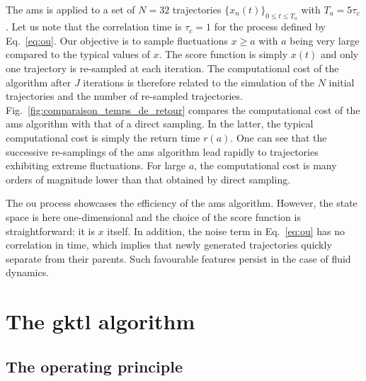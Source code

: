 \documentclass{jfm}
\newcommand{\EL}[1]{{\color{myred}{#1}}}
\begin{document}
	
	The \ac{ams} is applied  to a set of $N=32$ trajectories $\{x_n(t)\}_{0\leq t \leq T_a}$ with $T_a=5\tau_c$.
	Let us note that the correlation time is $\tau_c = 1$ for the process defined by Eq.~\eqref{eq:ou}.
	Our objective is to sample fluctuations $x\geq a$ with $a$ being very large compared to the typical values of $x$.
	The score function is simply $x(t)$ and only one trajectory is re-sampled at each iteration.
	The computational cost of the algorithm after $J$ iterations is therefore related to the simulation of the $N$ initial trajectories and the number of re-sampled trajectories.
	Fig.~\ref{fig:comparaison_temps_de_retour} compares the computational cost of the \ac{ams} algorithm with that of a direct sampling. 
	In the latter, the typical computational cost is simply the return time $r(a)$.
	One can see that the successive re-samplings of the \ac{ams} algorithm lead rapidly to trajectories exhibiting extreme fluctuations.
	For large $a$, the computational cost is many orders of magnitude lower than that obtained by direct sampling.
	
	The \acl{ou} process showcases the efficiency of the \ac{ams} algorithm.
	However, the state space is here one-dimensional and the choice of the score function is straightforward: it is $x$ itself.
	In addition, the noise term in Eq.~\eqref{eq:ou} has no correlation in time, which implies that newly generated trajectories quickly separate from their parents. Such favourable features \EL{do not} persist in the case of fluid dynamics.




\section{The \acl{gktl} algorithm}
\label{app:gktl_description}

\subsection{The operating principle}
\label{sec:gktl-operating-principle}
\end{document}

